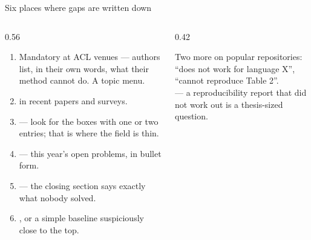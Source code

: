 \documentclass[aspectratio=169,11pt]{beamer}
\begin{document}
\begin{frame}{Six places where gaps are written down}
\begin{columns}[T]
\begin{column}{0.56\textwidth}
\footnotesize
\begin{enumerate}
  \item {} Mandatory at ACL venues --- authors list,
        in their own words, what their method cannot do. A topic menu.
  \item {} in recent papers and surveys.
  \item {} --- look for the boxes with one or two
        entries; that is where the field is thin.
  \item {} --- this year's open problems, in
        bullet form.
  \item {} --- the closing section says exactly what
        nobody solved.
  \item {}, or a simple baseline suspiciously close
        to the top.
\end{enumerate}
\end{column}
\begin{column}{0.42\textwidth}
\begin{block}{Two more}
\footnotesize
{} on popular repositories: ``does not work for language X'',
``cannot reproduce Table 2''.\\[4pt]
 --- a reproducibility report that did not work out
is a thesis-sized question.
\end{block}
\end{column}
\end{columns}
\end{frame}
\end{document}
